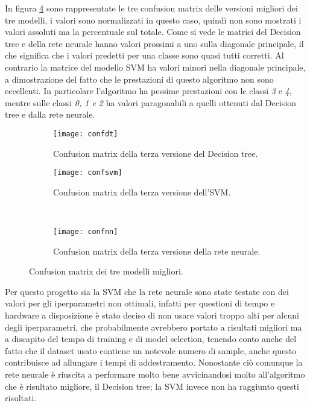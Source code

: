 In figura \ref{fig:conf} sono rappresentate le tre confusion matrix delle versioni migliori dei tre modelli, i valori sono normalizzati in questo caso, quindi non sono mostrati i valori assoluti ma la percentuale sul totale. Come si vede le matrici del Decision tree e della rete neurale hanno valori prossimi a uno sulla diagonale principale, il che significa che i valori predetti per una classe sono quasi tutti corretti. Al contrario la matrice del modello SVM ha valori minori nella diagonale principale, a dimostrazione del fatto che le prestazioni di questo algoritmo non sono eccellenti.  In particolare l'algoritmo ha pessime prestazioni con le classi \textit{3} e \textit{4}, mentre sulle classi \textit{0, 1 e 2} ha valori paragonabili a quelli ottenuti dal Decision tree e dalla rete neurale. 

\begin{figure}[h]
    \centering
    \begin{subfigure}[t]{0.4\textwidth}
        \centering\texttt{[image: confdt]}
        \caption{Confusion matrix della terza versione del Decision tree.}
        \label{fig:conf:dt}
    \end{subfigure}
    \begin{subfigure}[t]{0.4\textwidth}
        \centering\texttt{[image: confsvm]}
        \caption{Confusion matrix della terza versione dell'SVM.}
        \label{fig:conf:svm}
    \end{subfigure}
    \\
    \begin{subfigure}[t]{0.4\textwidth}
        \centering\texttt{[image: confnn]}
        \caption{Confusion matrix della terza versione della rete neurale.}
        \label{fig:conf:nn}
    \end{subfigure}
    \caption{Confusion matrix dei tre modelli migliori.}
    \label{fig:conf}
\end{figure}

Per questo progetto sia la SVM che la rete neurale sono state testate con dei valori per gli iperparametri non ottimali, infatti per questioni di tempo e hardware a disposizione è stato deciso di non usare valori troppo alti per alcuni degli iperparametri, che probabilmente avrebbero portato a risultati migliori ma a discapito del tempo di training e di model selection, tenendo conto anche del fatto che il dataset usato contiene un notevole numero di sample, anche questo contribuisce ad allungare i tempi di addestramento. Nonostante ciò comunque la rete neurale è riuscita a performare molto bene avvicinandosi molto all'algoritmo che è risultato migliore, il Decision tree; la SVM invece non ha raggiunto questi risultati.

